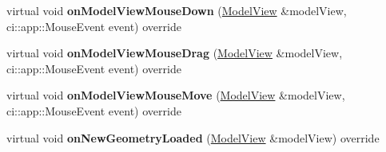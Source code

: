 \begin{DoxyCompactItemize}
\item 
\mbox{\label{classpepr3d_1_1_paint_bucket_af0204c28c5e9f6ec4a244ab0e9105ef6}} 
virtual void {\bfseries on\+Model\+View\+Mouse\+Down} (\mbox{\hyperlink{classpepr3d_1_1_model_view}{Model\+View}} \&model\+View, ci\+::app\+::\+Mouse\+Event event) override
\item 
\mbox{\label{classpepr3d_1_1_paint_bucket_a64f3acef2f66ba3c5b323267aeadd98d}} 
virtual void {\bfseries on\+Model\+View\+Mouse\+Drag} (\mbox{\hyperlink{classpepr3d_1_1_model_view}{Model\+View}} \&model\+View, ci\+::app\+::\+Mouse\+Event event) override
\item 
\mbox{\label{classpepr3d_1_1_paint_bucket_a4e667f3a895759cd6807241a378a6615}} 
virtual void {\bfseries on\+Model\+View\+Mouse\+Move} (\mbox{\hyperlink{classpepr3d_1_1_model_view}{Model\+View}} \&model\+View, ci\+::app\+::\+Mouse\+Event event) override
\item 
\mbox{\label{classpepr3d_1_1_paint_bucket_a3460bee5bb24684edcdeca08b76b4cc4}} 
virtual void {\bfseries on\+New\+Geometry\+Loaded} (\mbox{\hyperlink{classpepr3d_1_1_model_view}{Model\+View}} \&model\+View) override
\end{DoxyCompactItemize}
